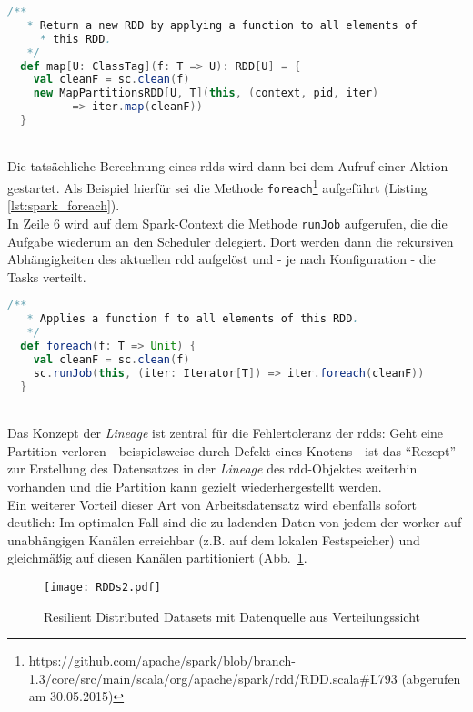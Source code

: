 \begin{lstlisting}[language=Scala,caption={Map-Methode aus org.apache.spark.rdd.RDD v1.3.0},label={lst:spark_map}]
  /**
   * Return a new RDD by applying a function to all elements of 
	 * this RDD.
   */
  def map[U: ClassTag](f: T => U): RDD[U] = {
    val cleanF = sc.clean(f)
    new MapPartitionsRDD[U, T](this, (context, pid, iter) 
		  => iter.map(cleanF))
  }
\end{lstlisting}
\\
Die tatsächliche Berechnung eines \glspl{rdd} wird dann bei dem Aufruf einer Aktion gestartet. Als Beispiel hierfür sei die Methode \lstinline|foreach|\footnote{https://github.com/apache/spark/blob/branch-1.3/core/src/main/scala/org/apache/spark/rdd/RDD.scala#L793 (abgerufen am 30.05.2015)} aufgeführt (Listing \ref{lst:spark_foreach}).\\
In Zeile 6 wird auf dem Spark-Context die Methode \lstinline|runJob| aufgerufen, die die Aufgabe wiederum an den Scheduler delegiert. Dort werden dann die rekursiven Abhängigkeiten des aktuellen \gls{rdd} aufgelöst und - je nach Konfiguration - die Tasks verteilt.\\

\begin{lstlisting}[language=Scala,caption={foreach-Methode aus org.apache.spark.rdd.RDD v1.3.0},label={lst:spark_foreach}]
  /**
   * Applies a function f to all elements of this RDD.
   */
  def foreach(f: T => Unit) {
    val cleanF = sc.clean(f)
    sc.runJob(this, (iter: Iterator[T]) => iter.foreach(cleanF))
  }
\end{lstlisting}
\\
Das Konzept der \textit{Lineage} ist zentral für die Fehlertoleranz der \gls{rdd}s:
Geht eine Partition verloren - beispielsweise durch Defekt eines Knotens - ist das "`Rezept"' zur Erstellung des Datensatzes in der \textit{Lineage} des \gls{rdd}-Objektes weiterhin vorhanden und die Partition kann gezielt wiederhergestellt werden.\\

Ein weiterer Vorteil dieser Art von Arbeitsdatensatz wird ebenfalls sofort deutlich: Im optimalen Fall sind die zu ladenden Daten von jedem der \gls{worker} auf unabhängigen Kanälen erreichbar (z.B. auf dem lokalen Festspeicher) und gleichmäßig auf diesen Kanälen partitioniert (Abb.~\ref{fig:rdds2}.\\

\begin{figure}[h!]
	\centering
  \texttt{[image: RDDs2.pdf]}
	\caption{Resilient Distributed Datasets mit Datenquelle aus Verteilungssicht}
	\label{fig:rdds2}
\end{figure}


